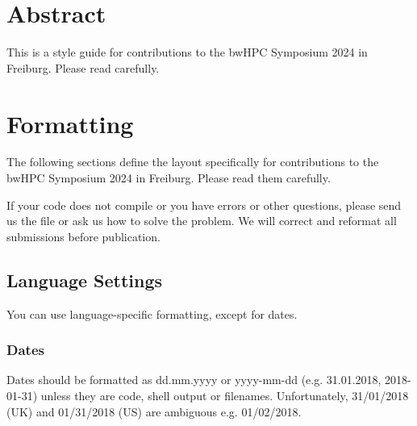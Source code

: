\documentclass[
  paper       = a4,
  headheight  = 16pt,
  footheight  = 16pt,
  fontsize    = 10pt,
  twoside     = true,
  titlepage   = true,
]{scrartcl}
\begin{document}


\rohead{\HeadTitle} %


\setcounter{page}{\Page}




\section*{Abstract}
This is a style guide for contributions to the bwHPC Symposium 2024 in Freiburg.
Please read carefully.


\section{Formatting}

The following sections define the layout specifically for contributions to the bwHPC Symposium 2024 in Freiburg.
Please read them carefully.

If your code does not compile or you have errors or other questions, please send us the file or ask us how to solve the problem.
We will correct and reformat all submissions before publication.


\subsection{Language Settings}

You can use language-specific formatting, except for dates.


\subsubsection{Dates}

Dates should be formatted as dd.mm.yyyy or yyyy-mm-dd (e.g. 31.01.2018, 2018-01-31) unless they are code, shell output or filenames.
Unfortunately, 31/01/2018 (UK) and 01/31/2018 (US) are ambiguous e.g. 01/02/2018.
\end{document}
